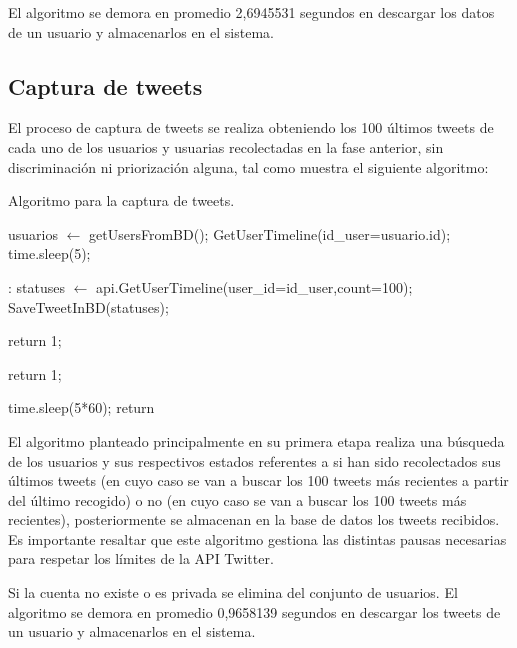 

El algoritmo se demora en promedio 2,6945531 segundos en descargar los datos de un usuario y almacenarlos en el sistema.

\subsection{Captura de tweets}

El proceso de captura de tweets se realiza obteniendo los 100 últimos tweets de cada uno de los usuarios y usuarias recolectadas en la fase anterior, sin discriminación ni priorización alguna, tal como muestra el siguiente algoritmo:

\begin{algorithm}[H]
	\caption{Algoritmo para la captura de tweets.}\label{getTweets}
	\begin{algorithmic}[1]
		\State usuarios $\gets$ getUsersFromBD();
		\State GetUserTimeline(id\_user=usuario.id);
		\EndFor
		\State time.sleep(5);
		\EndFunction
		
		:
		\State statuses $\gets$ api.GetUserTimeline(user\_id=id\_user,count=100);
		\State SaveTweetInBD(statuses);
		
		\State return 1;
		\EndIf
		
		\State return 1;
		\EndIf
		
		\State time.sleep(5*60);
		\State return
		\EndIf
		\EndFunction
	\end{algorithmic}
\end{algorithm}

El algoritmo planteado principalmente en su primera etapa realiza una búsqueda de los usuarios y sus respectivos estados referentes a si han sido recolectados sus últimos tweets (en cuyo caso se van a buscar los 100 tweets más recientes a partir del último recogido) o no (en cuyo caso se van a buscar los 100 tweets más recientes), posteriormente se almacenan en la base de datos los tweets recibidos. Es importante resaltar que este algoritmo gestiona las distintas pausas necesarias para respetar los límites de la API Twitter.

Si la cuenta no existe o es privada se elimina del conjunto de usuarios. El algoritmo se demora en promedio 0,9658139 segundos en descargar los tweets de un usuario y almacenarlos en el sistema.

